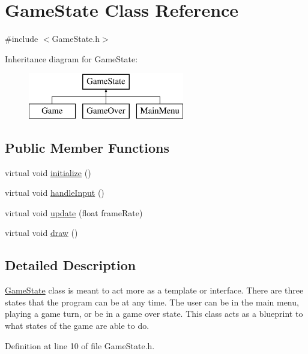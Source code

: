 \hypertarget{class_game_state}{}\section{Game\+State Class Reference}
\label{class_game_state}


{\ttfamily \#include $<$Game\+State.\+h$>$}

Inheritance diagram for Game\+State\+:\begin{figure}[H]
\begin{center}
\leavevmode
\includegraphics[height=2.000000cm]{class_game_state}
\end{center}
\end{figure}
\subsection*{Public Member Functions}
\begin{DoxyCompactItemize}
\item 
virtual void \mbox{\hyperlink{class_game_state_a22d3404f53895a23359557a713194736}{initialize}} ()
\item 
virtual void \mbox{\hyperlink{class_game_state_a734dd3521eb3056ee7d3f3e7c982b5a9}{handle\+Input}} ()
\item 
virtual void \mbox{\hyperlink{class_game_state_a52648f2b2e90f0e1e41a1763ebb061ba}{update}} (float frame\+Rate)
\item 
virtual void \mbox{\hyperlink{class_game_state_adf753ecc90e0b309c849b117036e619e}{draw}} ()
\end{DoxyCompactItemize}


\subsection{Detailed Description}
\mbox{\hyperlink{class_game_state}{Game\+State}} class is meant to act more as a template or interface. There are three states that the program can be at any time. The user can be in the main menu, playing a game turn, or be in a game over state. This class acts as a blueprint to what states of the game are able to do. 

Definition at line 10 of file Game\+State.\+h.



